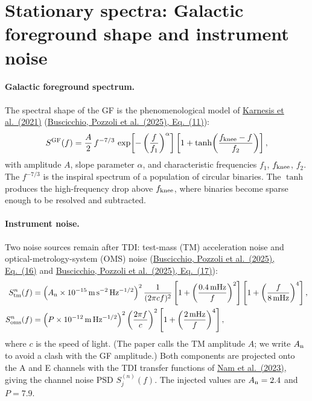 \documentclass[11pt,a4paper]{article}
\newcommand{\urlPone}{https://arxiv.org/pdf/2511.03604}
\newcommand{\PoneEq}[1]{\href{\urlPone}{Buscicchio, Pozzoli et al.~(2025), Eq.~(#1)}}
\begin{document}
\section{Stationary spectra: Galactic foreground shape and instrument noise}\label{sec:spectra}

\paragraph{Galactic foreground spectrum.} The spectral shape of the GF is the
phenomenological model of \href{https://arxiv.org/abs/2103.14598}{Karnesis et al.~(2021)}
(\PoneEq{11}):
\begin{equation}
  S^{\rm GF}(f) = \frac{A}{2}\, f^{-7/3}\,
  \exp\!\left[-\left(\frac{f}{f_1}\right)^{\alpha}\right]
  \left[1+\tanh\!\left(\frac{f_{\rm knee}-f}{f_2}\right)\right],
  \label{eq:sgf}
\end{equation}
with amplitude $A$, slope parameter $\alpha$, and characteristic frequencies
$f_1$, $f_{\rm knee}$, $f_2$. The $f^{-7/3}$ is the inspiral spectrum of a
population of circular binaries. The $\tanh$ produces the high-frequency drop above
$f_{\rm knee}$, where binaries become sparse enough to be resolved and subtracted.

\paragraph{Instrument noise.} Two noise sources remain after TDI: test-mass (TM)
acceleration noise and optical-metrology-system (OMS) noise (\PoneEq{16} and
\PoneEq{17}):
\begin{align}
  S^n_{\rm tm}(f) &= \left(A_{\rm n}\times10^{-15}\,\mathrm{m\,s^{-2}\,Hz^{-1/2}}\right)^2
  \frac{1}{(2\pi c f)^2}
  \left[1+\left(\frac{0.4\,\mathrm{mHz}}{f}\right)^2\right]
  \left[1+\left(\frac{f}{8\,\mathrm{mHz}}\right)^4\right], \label{eq:tm}\\
  S^n_{\rm oms}(f) &= \left(P\times10^{-12}\,\mathrm{m\,Hz^{-1/2}}\right)^2
  \left(\frac{2\pi f}{c}\right)^2
  \left[1+\left(\frac{2\,\mathrm{mHz}}{f}\right)^4\right], \label{eq:oms}
\end{align}
where $c$ is the speed of light. (The paper calls the TM amplitude $A$; we write
$A_{\rm n}$ to avoid a clash with the GF amplitude.) Both components are projected
onto the A and E channels with the TDI transfer functions of
\href{https://arxiv.org/abs/2211.02539}{Nam et al.~(2023)}, giving the channel noise
PSD $S^{(n)}_{j}(f)$. The injected values are $A_{\rm n}=2.4$ and $P=7.9$.
\end{document}
